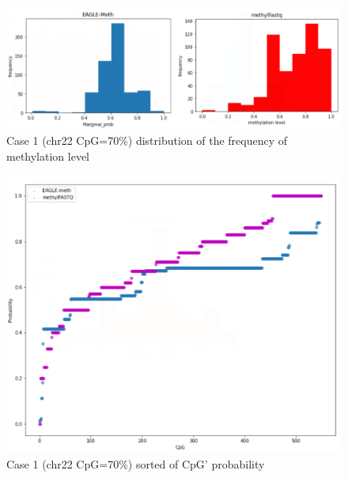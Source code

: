 \documentclass{PHlab-thesis}
\begin{document}
\begin{figure}[h]
  \centering
  \includegraphics[scale=0.8]{figures/CHR22_70.PNG}
  \caption{Case 1 (chr22 CpG=70\%) distribution of the frequency of methylation level}
  \label{fig:case_1_1} 
\end{figure}
\begin{figure}[h]
  \centering
  \includegraphics[scale=0.8]{figures/CHR22_70_2.PNG}
  \caption{Case 1 (chr22 CpG=70\%) sorted of CpG' probability}
  \label{fig:case_1_2} 
\end{figure}
\end{document}
